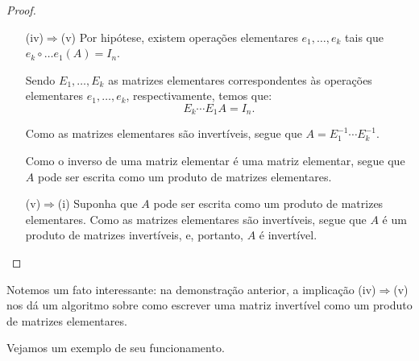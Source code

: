 \begin{proof}
\begin{itemize}
        \item[(iv)$\Rightarrow$(v)] Por hipótese, existem operações elementares $e_1, \dots, e_k$ tais que $e_k\circ \dots e_1(A)=I_n$.
        
        Sendo $E_1, \dots, E_k$ as matrizes elementares correspondentes às operações elementares $e_1, \dots, e_k$, respectivamente, temos que:
        \begin{equation*}
            E_k \cdots E_1 A = I_n.
        \end{equation*}

        Como as matrizes elementares são invertíveis, segue que $A = E_1^{-1} \cdots E_k^{-1}$.

        Como o inverso de uma matriz elementar é uma matriz elementar, segue que $A$ pode ser escrita como um produto de matrizes elementares.

        \item[(v)$\Rightarrow$(i)] Suponha que $A$ pode ser escrita como um produto de matrizes elementares.
        Como as matrizes elementares são invertíveis, segue que $A$ é um produto de matrizes invertíveis, e, portanto, $A$ é invertível.
    \end{itemize}
\end{proof}

Notemos um fato interessante: na demonstração anterior, a implicação (iv)$\Rightarrow$(v) nos dá um algoritmo sobre como escrever uma matriz invertível como um produto de matrizes elementares.

Vejamos um exemplo de seu funcionamento.

